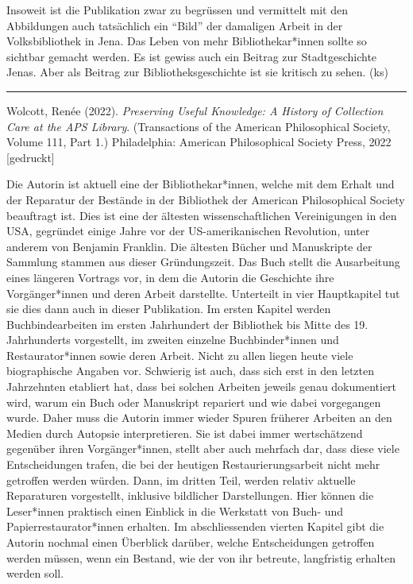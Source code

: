 \documentclass[a4paper,
fontsize=11pt,
oneside,
numbers=noperiodatend,
parskip=half-,
bibliography=totoc,
final
]{scrartcl}
\begin{document}
Insoweit ist die Publikation zwar zu begrüssen und vermittelt mit den
Abbildungen auch tatsächlich ein \enquote{Bild} der damaligen Arbeit in
der Volksbibliothek in Jena. Das Leben von mehr Bibliothekar*innen
sollte so sichtbar gemacht werden. Es ist gewiss auch ein Beitrag zur
Stadtgeschichte Jenas. Aber als Beitrag zur Bibliotheksgeschichte ist
sie kritisch zu sehen. (ks)

\begin{center}\rule{0.5\linewidth}{0.5pt}\end{center}

Wolcott, Renée (2022). \emph{Preserving Useful Knowledge: A History of
Collection Care at the APS Library}. (Transactions of the American
Philosophical Society, Volume 111, Part 1.) Philadelphia: American
Philosophical Society Press, 2022 {[}gedruckt{]}

Die Autorin ist aktuell eine der Bibliothekar*innen, welche mit dem
Erhalt und der Reparatur der Bestände in der Bibliothek der American
Philosophical Society beauftragt ist. Dies ist eine der ältesten
wissenschaftlichen Vereinigungen in den USA, gegründet einige Jahre vor
der US-amerikanischen Revolution, unter anderem von Benjamin Franklin.
Die ältesten Bücher und Manuskripte der Sammlung stammen aus dieser
Gründungszeit. Das Buch stellt die Ausarbeitung eines längeren Vortrags
vor, in dem die Autorin die Geschichte ihre Vorgänger*innen und deren
Arbeit darstellte. Unterteilt in vier Hauptkapitel tut sie dies dann
auch in dieser Publikation. Im ersten Kapitel werden Buchbindearbeiten
im ersten Jahrhundert der Bibliothek bis Mitte des 19. Jahrhunderts
vorgestellt, im zweiten einzelne Buchbinder*innen und Restaurator*innen
sowie deren Arbeit. Nicht zu allen liegen heute viele biographische
Angaben vor. Schwierig ist auch, dass sich erst in den letzten
Jahrzehnten etabliert hat, dass bei solchen Arbeiten jeweils genau
dokumentiert wird, warum ein Buch oder Manuskript repariert und wie
dabei vorgegangen wurde. Daher muss die Autorin immer wieder Spuren
früherer Arbeiten an den Medien durch Autopsie interpretieren. Sie ist
dabei immer wertschätzend gegenüber ihren Vorgänger*innen, stellt aber
auch mehrfach dar, dass diese viele Entscheidungen trafen, die bei der
heutigen Restaurierungsarbeit nicht mehr getroffen werden würden. Dann,
im dritten Teil, werden relativ aktuelle Reparaturen vorgestellt,
inklusive bildlicher Darstellungen. Hier können die Leser*innen
praktisch einen Einblick in die Werkstatt von Buch- und
Papierrestaurator*innen erhalten. Im abschliessenden vierten Kapitel
gibt die Autorin nochmal einen Überblick darüber, welche Entscheidungen
getroffen werden müssen, wenn ein Bestand, wie der von ihr betreute,
langfristig erhalten werden soll.
\end{document}
